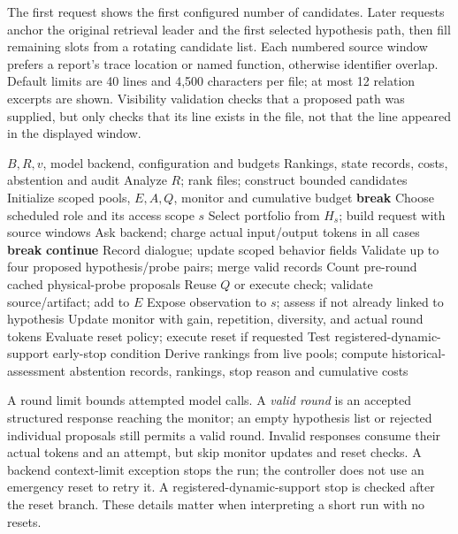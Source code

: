 \documentclass[letterpaper,journal]{IEEEtran}
\begin{document}
The first request shows the first configured number of candidates. Later requests anchor the original retrieval leader and the first selected hypothesis path, then fill remaining slots from a rotating candidate list. Each numbered source window prefers a report's trace location or named function, otherwise identifier overlap. Default limits are 40 lines and 4,500 characters per file; at most 12 relation excerpts are shown. Visibility validation checks that a proposed path was supplied, but only checks that its line exists in the file, not that the line appeared in the displayed window.

\begin{algorithm}[t]
\caption{Budgeted localization controller}\label{alg:controller}
\begin{algorithmic}[1]\small
\Require $B,R,v$, model backend, configuration and budgets
\Ensure Rankings, state records, costs, abstention and audit
\State Analyze $R$; rank files; construct bounded candidates
\State Initialize scoped pools, $E,A,Q$, monitor and cumulative budget
   \State \textbf{break} \EndIf
  \State Choose scheduled role and its access scope $s$
  \State Select portfolio from $H_s$; build request with source windows
  \State Ask backend; charge actual input/output tokens in all cases
   \State \textbf{break} \EndIf
   \State \textbf{continue} \EndIf
  \State Record dialogue; update scoped behavior fields
  \State Validate up to four proposed hypothesis/probe pairs; merge valid records
  \State Count pre-round cached physical-probe proposals
      \State Reuse $Q$ or execute check; validate source/artifact; add to $E$
      \State Expose observation to $s$; assess if not already linked to hypothesis
    \EndFor
  \EndIf
  \State Update monitor with gain, repetition, diversity, and actual round tokens
  \State Evaluate reset policy; execute reset if requested
  \State Test registered-dynamic-support early-stop condition
\EndFor
\State Derive rankings from live pools; compute historical-assessment abstention
\State \Return records, rankings, stop reason and cumulative costs
\end{algorithmic}
\end{algorithm}

A round limit bounds attempted model calls. A \emph{valid round} is an accepted structured response reaching the monitor; an empty hypothesis list or rejected individual proposals still permits a valid round. Invalid responses consume their actual tokens and an attempt, but skip monitor updates and reset checks. A backend context-limit exception stops the run; the controller does not use an emergency reset to retry it. A registered-dynamic-support stop is checked after the reset branch. These details matter when interpreting a short run with no resets.
\end{document}
